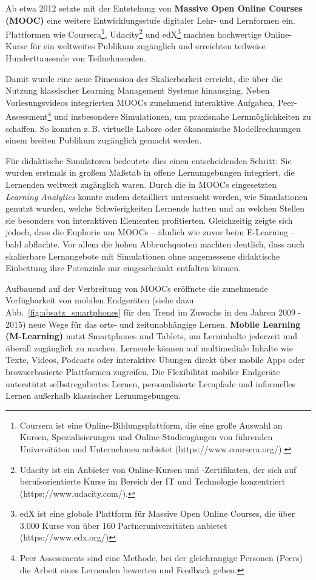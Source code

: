 Ab etwa 2012 setzte mit der Entstehung von \textbf{Massive Open Online Courses (MOOC)} eine weitere Entwicklungsstufe digitaler Lehr- und Lernformen ein. Plattformen wie Coursera\footnote{Coursera ist eine Online-Bildungsplattform, die eine große Auswahl an Kursen, Spezialisierungen und Online-Studiengängen von führenden Universitäten und Unternehmen anbietet (https://www.coursera.org/).}, Udacity\footnote{Udacity ist ein Anbieter von Online-Kursen und -Zertifikaten, der sich auf berufsorientierte Kurse im Bereich der IT und Technologie konzentriert (https://www.udacity.com/).} und edX\footnote{edX ist eine globale Plattform für Massive Open Online Courses, die über 3.000 Kurse von über 160 Partneruniversitäten anbietet (https://www.edx.org/)} machten hochwertige Online-Kurse für ein weltweites Publikum zugänglich und erreichten teilweise Hunderttausende von Teilnehmenden.\cite{pappano_year_2012} 

Damit wurde eine neue Dimension der Skalierbarkeit erreicht, die über die Nutzung klassischer Learning Management Systeme hinausging. Neben Vorlesungsvideos integrierten MOOCs zunehmend interaktive Aufgaben, Peer-Assessment\footnote{Peer Assessments sind eine Methode, bei der gleichrangige Personen (Peers) die Arbeit eines Lernenden bewerten und Feedback geben.\cite{tum_wenn_2022}} und insbesondere Simulationen, um praxisnahe Lernmöglichkeiten zu schaffen. So konnten z.\,B. virtuelle Labore oder ökonomische Modellrechnungen einem breiten Publikum zugänglich gemacht werden.\parencite[S.~5f]{yuan_moocs_2013} 

Für didaktische Simulatoren bedeutete dies einen entscheidenden Schritt: Sie wurden erstmals in großem Maßstab in offene Lernumgebungen integriert, die Lernenden weltweit zugänglich waren.  Durch die in MOOCs eingesetzten \textit{Learning Analytics} konnte zudem detailliert untersucht werden, wie Simulationen genutzt wurden, welche Schwierigkeiten Lernende hatten und an welchen Stellen sie besonders von interaktiven Elementen profitierten. Gleichzeitig zeigte sich jedoch, dass die Euphorie um MOOCs – ähnlich wie zuvor beim E-Learning – bald abflachte. Vor allem die hohen Abbruchquoten machten deutlich, dass auch skalierbare Lernangebote mit Simulationen ohne angemessene didaktische Einbettung ihre Potenziale nur eingeschränkt entfalten können.\parencite[S.~1242]{khalil_moocs_2014} 

Aufbauend auf der Verbreitung von MOOCs eröffnete die zunehmende Verfügbarkeit von mobilen Endgeräten (siehe dazu Abb.~\ref{fig:absatz_smartphones} für den Trend im Zuwachs in den Jahren 2009 - 2015) neue Wege für das orts- und zeitunabhängige Lernen. \textbf{Mobile Learning (M-Learning)} nutzt Smartphones und Tablets, um Lerninhalte jederzeit und überall zugänglich zu machen. Lernende können auf multimediale Inhalte wie Texte, Videos, Podcasts oder interaktive Übungen direkt über mobile Apps oder browserbasierte Plattformen zugreifen. Die Flexibilität mobiler Endgeräte unterstützt selbstreguliertes Lernen, personalisierte Lernpfade und informelles Lernen außerhalb klassischer Lernumgebungen.\parencite[S.~306]{nolting_strukturiertes_2004}

